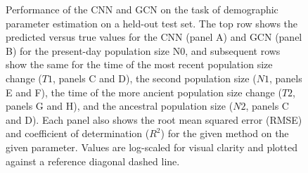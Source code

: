 \begin{figure}
    \centering
    \caption[Performance of the CNN and GCN on the task of demographic parameter estimation on a held-out test set]{Performance of the CNN and GCN on the task of demographic parameter estimation on a held-out test set. The top row shows the predicted versus true values for the CNN (panel A) and GCN (panel B) for the present-day population size N0, and subsequent rows show the same for the time of the most recent population size change ($T1$, panels C and D), the second population size ($N1$, panels E and F), the time of the more ancient population size change ($T2$, panels G and H), and the ancestral population size ($N2$, panels C and D). Each panel also shows the root mean squared error (RMSE) and coefficient of determination ($R^2$) for the given method on the given parameter. Values are log-scaled for visual clarity and plotted against a reference diagonal dashed line.}
    \label{fig:enter-label}
\end{figure}

